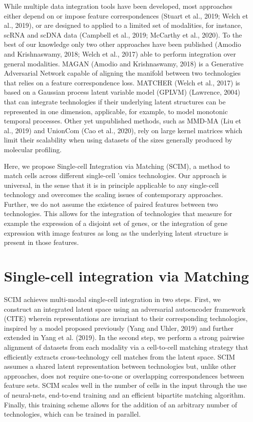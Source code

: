 While multiple data integration tools have been developed, most approaches either depend on or impose feature correspondences (Stuart et al., 2019; Welch et al., 2019), or are designed to applied to a limited set of modalities, for instance, scRNA and scDNA data (Campbell et al., 2019; McCarthy et al., 2020).
To the best of our knowledge only two other approaches have been published (Amodio and Krishnaswamy, 2018; Welch et al., 2017) able to perform integration over general modalities.
MAGAN (Amodio and Krishnaswamy, 2018) is a Generative Adversarial Network capable of aligning the manifold between two technologies that relies on a feature correspondence loss.
MATCHER (Welch et al., 2017) is based on a Gaussian process latent variable model (GPLVM) (Lawrence, 2004) that can integrate technologies if their underlying latent structures can be represented in one dimension, applicable, for example, to model monotonic temporal processes.
Other yet unpublished methods, such as MMD-MA (Liu et al., 2019) and UnionCom (Cao et al., 2020), rely on large kernel matrices which limit their scalability when using datasets of the sizes generally produced by molecular profiling.

Here, we propose Single-cell Integration via Matching (SCIM), a method to match cells across different single-cell ’omics technologies.
Our approach is universal, in the sense that it is in principle applicable to any single-cell technology and overcomes the scaling issues of contemporary approaches.
Further, we do not assume the existence of paired features between two technologies.
This allows for the integration of technologies that measure for example the expression of a disjoint set of genes, or the integration of gene expression with image features as long as the underlying latent structure is present in those features.

\section{Single-cell integration via Matching}
SCIM achieves multi-modal single-cell integration in two steps.
First, we construct an integrated latent space using an adversarial autoencoder framework (CITE) wherein representations are invariant to their corresponding technologies, inspired by a model proposed previously (Yang and Uhler, 2019) and further extended in Yang et al. (2019).
In the second step, we perform a strong pairwise alignment of datasets from each modality via a cell-to-cell matching strategy that efficiently extracts cross-technology cell matches from the latent space.
SCIM assumes a shared latent representation between technologies but, unlike other approaches, does not require one-to-one or overlapping correspondences between feature sets.
SCIM scales well in the number of cells in the input through the use of neural-nets, end-to-end training and an efficient bipartite matching algorithm.
Finally, this training scheme allows for the addition of an arbitrary number of technologies, which can be trained in parallel.

